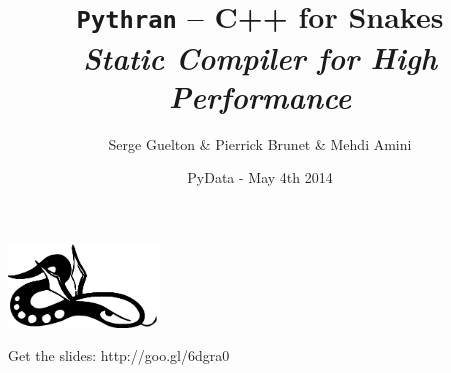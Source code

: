 \documentclass[aspectratio=1610]{beamer}
\author[Serge Guelton, Pierrick Brunet, Mehdi Amini]{Serge Guelton \& Pierrick Brunet \& Mehdi Amini}
\title[\texttt{pythran}]{\texttt{Pythran} -- C++ for Snakes\\\emph{\small Static Compiler for High Performance}}
\date{\small{PyData - May 4th 2014}}
\institute{}
\begin{document}
\begin{frame}
  \maketitle
\vspace{-0.5cm}
  \begin{center}
    \includegraphics[height=6em]{logo}
  \end{center}
  \vfill
  \hfill
  \scriptsize{Get the slides: http://goo.gl/6dgra0}
\end{frame}

% 
% 
\end{document}
